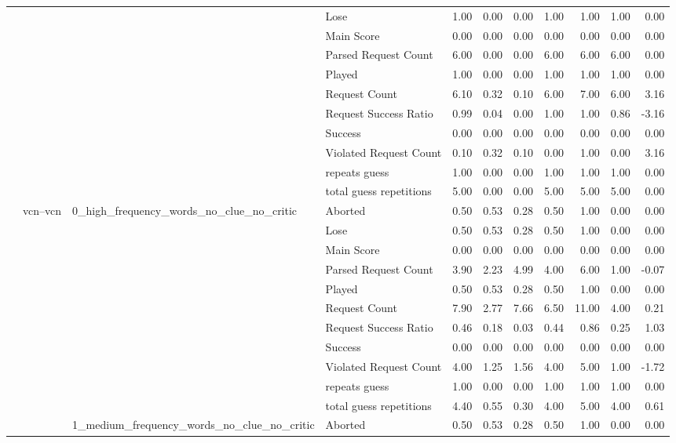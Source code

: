 \begin{tabular}{llllrrrrrrr}
 &  &  & Lose & 1.00 & 0.00 & 0.00 & 1.00 & 1.00 & 1.00 & 0.00 \\
 &  &  & Main Score & 0.00 & 0.00 & 0.00 & 0.00 & 0.00 & 0.00 & 0.00 \\
 &  &  & Parsed Request Count & 6.00 & 0.00 & 0.00 & 6.00 & 6.00 & 6.00 & 0.00 \\
 &  &  & Played & 1.00 & 0.00 & 0.00 & 1.00 & 1.00 & 1.00 & 0.00 \\
 &  &  & Request Count & 6.10 & 0.32 & 0.10 & 6.00 & 7.00 & 6.00 & 3.16 \\
 &  &  & Request Success Ratio & 0.99 & 0.04 & 0.00 & 1.00 & 1.00 & 0.86 & -3.16 \\
 &  &  & Success & 0.00 & 0.00 & 0.00 & 0.00 & 0.00 & 0.00 & 0.00 \\
 &  &  & Violated Request Count & 0.10 & 0.32 & 0.10 & 0.00 & 1.00 & 0.00 & 3.16 \\
 &  &  & repeats guess & 1.00 & 0.00 & 0.00 & 1.00 & 1.00 & 1.00 & 0.00 \\
 &  &  & total guess repetitions & 5.00 & 0.00 & 0.00 & 5.00 & 5.00 & 5.00 & 0.00 \\
\cline{2-11} \cline{3-11}
 & \multirow[t]{33}{*}{vcn--vcn} & \multirow[t]{11}{*}{0_high_frequency_words_no_clue_no_critic} & Aborted & 0.50 & 0.53 & 0.28 & 0.50 & 1.00 & 0.00 & 0.00 \\
 &  &  & Lose & 0.50 & 0.53 & 0.28 & 0.50 & 1.00 & 0.00 & 0.00 \\
 &  &  & Main Score & 0.00 & 0.00 & 0.00 & 0.00 & 0.00 & 0.00 & 0.00 \\
 &  &  & Parsed Request Count & 3.90 & 2.23 & 4.99 & 4.00 & 6.00 & 1.00 & -0.07 \\
 &  &  & Played & 0.50 & 0.53 & 0.28 & 0.50 & 1.00 & 0.00 & 0.00 \\
 &  &  & Request Count & 7.90 & 2.77 & 7.66 & 6.50 & 11.00 & 4.00 & 0.21 \\
 &  &  & Request Success Ratio & 0.46 & 0.18 & 0.03 & 0.44 & 0.86 & 0.25 & 1.03 \\
 &  &  & Success & 0.00 & 0.00 & 0.00 & 0.00 & 0.00 & 0.00 & 0.00 \\
 &  &  & Violated Request Count & 4.00 & 1.25 & 1.56 & 4.00 & 5.00 & 1.00 & -1.72 \\
 &  &  & repeats guess & 1.00 & 0.00 & 0.00 & 1.00 & 1.00 & 1.00 & 0.00 \\
 &  &  & total guess repetitions & 4.40 & 0.55 & 0.30 & 4.00 & 5.00 & 4.00 & 0.61 \\
\cline{3-11}
 &  & \multirow[t]{11}{*}{1_medium_frequency_words_no_clue_no_critic} & Aborted & 0.50 & 0.53 & 0.28 & 0.50 & 1.00 & 0.00 & 0.00 \\

\end{tabular}
